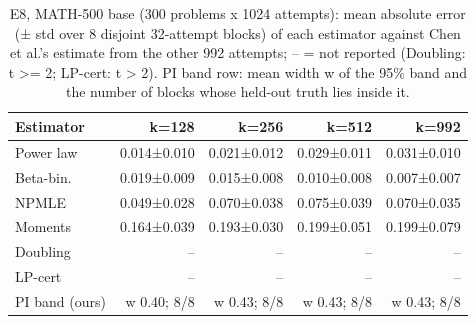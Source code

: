 \begin{table}[t]
\centering
\small
\begin{tabular}{lrrrr}
\toprule
Estimator & k=128 & k=256 & k=512 & k=992 \\
\midrule
Power law & 0.014±0.010 & 0.021±0.012 & 0.029±0.011 & 0.031±0.010 \\
Beta-bin. & 0.019±0.009 & 0.015±0.008 & 0.010±0.008 & 0.007±0.007 \\
NPMLE & 0.049±0.028 & 0.070±0.038 & 0.075±0.039 & 0.070±0.035 \\
Moments & 0.164±0.039 & 0.193±0.030 & 0.199±0.051 & 0.199±0.079 \\
Doubling & -- & -- & -- & -- \\
LP-cert & -- & -- & -- & -- \\
PI band (ours) & w 0.40; 8/8 & w 0.43; 8/8 & w 0.43; 8/8 & w 0.43; 8/8 \\
\bottomrule
\end{tabular}
\caption{E8, MATH-500 base (300 problems x 1024 attempts): mean absolute error (± std over 8 disjoint 32-attempt blocks) of each estimator against Chen et al.'s estimate from the other 992 attempts; -- = not reported (Doubling: t >= 2; LP-cert: t > 2). PI band row: mean width w of the 95\% band and the number of blocks whose held-out truth lies inside it.}
\label{tab:T13_ground_truth_math500}
\end{table}
